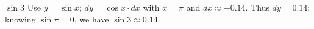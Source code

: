 {$\sin 3$
}
{Use $y = \sin x$; $dy = \cos x\cdot dx$ with $x=\pi$ and $dx \approx -0.14$. Thus $dy = 0.14$; knowing $\sin \pi = 0$, we have $\sin 3 \approx 0.14$.
}

